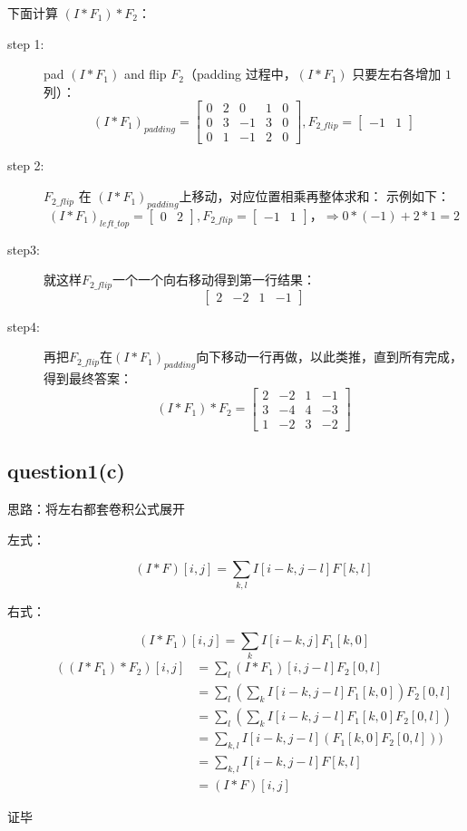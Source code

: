 \documentclass[a4paper,UTF8]{article}
\numberwithin{equation}{section}
\begin{document}
下面计算 $(I*F_1)*F_2$：
\begin{description}
\item[step 1:]pad $(I*F_1)$ and flip $F_2$（padding 过程中，$(I*F_1)$ 只要左右各增加 $1$ 列）：
\begin{equation}
(I*F_1)_{padding}={
\left[ \begin{array}{ccccc}
0&2&0&1&0\\
0&3&-1&3&0\\
0&1&-1&2&0
\end{array}
\right ]},
F_{2\_flip}={
\left[ \begin{array}{cc}
-1&1
\end{array}
\right ]}
\end{equation}
\item[step 2:] $F_{2\_flip}$ 在 $(I*F_1)_{padding}$上移动，对应位置相乘再整体求和：
示例如下：
\begin{equation}
(I*F_1)_{left\_top}={
\left[ \begin{array}{cc}
0&2
\end{array} 
\right ]},
F_{2\_flip}={
\left[ \begin{array}{cc}
-1&1
\end{array}
\right ]}，
\Rightarrow 0*(-1)+2*1=2
\end{equation}
\item[step3:] 就这样$F_{2\_flip}$一个一个向右移动得到第一行结果：
\begin{equation}
{
\left[ \begin{array}{cccc}
2&-2&1&-1
\end{array} 
\right ]}
\end{equation}
\item[step4:] 再把$F_{2\_flip}$在$(I*F_1)_{padding}$向下移动一行再做，以此类推，直到所有完成，得到最终答案：
\begin{equation}
(I*F_1)*F_2={
\left[ \begin{array}{cccc}
2&-2&1&-1\\
3&-4&4&-3\\
1&-2&3&-2
\end{array}
\right ]}
\end{equation}
\end{description}
\subsection{question1(c)}
思路：将左右都套卷积公式展开
\begin{description}
\item[左式：]$$(I*F)[i,j]=\sum_{k,l}I[i-k,j-l]F[k,l]$$
\item[右式：]$$(I*F_1)[i,j]=\sum_{k}I[i-k,j]F_1[k,0]$$
\begin{align*}
((I*F_1)*F_2)[i,j]&=\sum_{l}(I*F_1)[i,j-l]F_2[0,l]\\
&=\sum_{l}(\sum_{k}I[i-k,j-l]F_1[k,0])F_2[0,l]\\
&=\sum_{l}(\sum_{k}I[i-k,j-l]F_1[k,0]F_2[0,l])\\
&=\sum_{k,l}I[i-k,j-l](F_1[k,0]F_2[0,l]))\\
&=\sum_{k,l}I[i-k,j-l]F[k,l]\\
&=(I*F)[i,j]
\end{align*}
\end{description}
证毕
\end{document}
